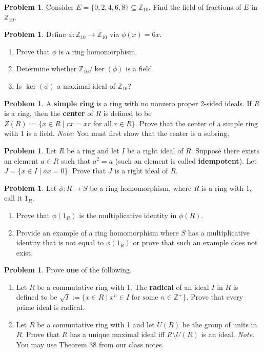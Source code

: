 \documentclass[11pt]{scrartcl}
\theoremstyle{definition}
\newtheorem{problem}[theorem]{Problem}
\begin{document}
\begin{problem}
Consider $E=\{0,2,4,6,8\}\subseteq \mathbb{Z}_{10}$.  Find the field of fractions of $E$ in $\mathbb{Z}_{10}$.
\end{problem}

\begin{problem}
Define $\phi:\mathbb{Z}_{10}\to \mathbb{Z}_{10}$ via $\phi(x)=6x$. 
\begin{enumerate}[label=\rm{(\alph*)}]
\item Prove that $\phi$ is a ring homomorphism.
\item Determine whether $\mathbb{Z}_{10}/\ker(\phi)$ is a field.
\item Is $\ker(\phi)$ a maximal ideal of $\mathbb{Z}_{10}$?
\end{enumerate}
\end{problem}

\begin{problem}
A \textbf{simple ring} is a ring with no nonzero proper 2-sided ideals.  If $R$ is a ring, then the \textbf{center} of $R$ is defined to be $Z(R):=\{x\in R\mid rx=xr\text{ for all } r\in R\}$.  Prove that the center of a simple ring with 1 is a field.  \emph{Note:} You must first show that the center is a subring.
\end{problem}

\begin{problem}
Let $R$ be a ring and let $I$ be a right ideal of $R$.  Suppose there exists an element $a\in R$ such that $a^2=a$ (such an element is called \textbf{idempotent}). Let $J=\{x\in I\mid ax=0\}$. Prove that $J$ is a right ideal of $R$.
\end{problem}

\begin{problem}
Let $\phi:R\to S$ be a ring homomorphism, where $R$ is a ring with 1, call it $1_R$.
\begin{enumerate}[label=\rm{(\alph*)}]
\item Prove that $\phi(1_R)$ is the multiplicative identity in $\phi(R)$.
\item Provide an example of a ring homomorphism where $S$ has a multiplicative identity that is not equal to $\phi(1_R)$ or prove that such an example does not exist.
\end{enumerate}
\end{problem}

\begin{problem}
Prove \textbf{one} of the following.
\begin{enumerate}[label=\rm{(\alph*)}]
\item Let $R$ be a commutative ring with 1.  The \textbf{radical} of an ideal $I$ in $R$ is defined to be $\sqrt{I}:=\{x\in R\mid x^n\in I\text{ for some }n\in\mathbb{Z}^+\}$. Prove that every prime ideal is radical.
\item Let $R$ be a commutative ring with 1 and let $U(R)$ be the group of units in $R$.  Prove that $R$ has a unique maximal ideal iff $R\setminus U(R)$ is an ideal.  \emph{Note:} You may use Theorem 38 from our class notes.
\end{enumerate}
\end{problem}
\end{document}
